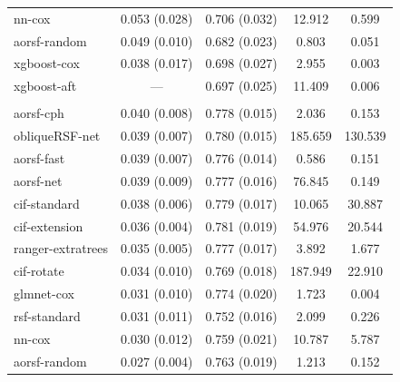 \documentclass[twoside,11pt]{article}\usepackage[]{graphicx}\usepackage[]{xcolor}
\newenvironment{knitrout}{}{} %
\begin{document}
\begin{knitrout}
\begin{longtable}[t]{lcccc}
\hspace{1em}nn-cox & 0.053 (0.028) & 0.706 (0.032) & 12.912 & 0.599\\
\hspace{1em}aorsf-random & 0.049 (0.010) & 0.682 (0.023) & 0.803 & 0.051\\
\hspace{1em}xgboost-cox & 0.038 (0.017) & 0.698 (0.027) & 2.955 & 0.003\\
\hspace{1em}xgboost-aft & --- & 0.697 (0.025) & 11.409 & 0.006\\
\addlinespace[0.3em]
\multicolumn{5}{l}{\textit{\textbf{JHS; coronary heart disease, n = 3501, p = 80}}}\\
\hline
\hspace{1em}aorsf-cph & 0.040 (0.008) & 0.778 (0.015) & 2.036 & 0.153\\
\hspace{1em}obliqueRSF-net & 0.039 (0.007) & 0.780 (0.015) & 185.659 & 130.539\\
\hspace{1em}aorsf-fast & 0.039 (0.007) & 0.776 (0.014) & 0.586 & 0.151\\
\hspace{1em}aorsf-net & 0.039 (0.009) & 0.777 (0.016) & 76.845 & 0.149\\
\hspace{1em}cif-standard & 0.038 (0.006) & 0.779 (0.017) & 10.065 & 30.887\\
\hspace{1em}cif-extension & 0.036 (0.004) & 0.781 (0.019) & 54.976 & 20.544\\
\hspace{1em}ranger-extratrees & 0.035 (0.005) & 0.777 (0.017) & 3.892 & 1.677\\
\hspace{1em}cif-rotate & 0.034 (0.010) & 0.769 (0.018) & 187.949 & 22.910\\
\hspace{1em}glmnet-cox & 0.031 (0.010) & 0.774 (0.020) & 1.723 & 0.004\\
\hspace{1em}rsf-standard & 0.031 (0.011) & 0.752 (0.016) & 2.099 & 0.226\\
\hspace{1em}nn-cox & 0.030 (0.012) & 0.759 (0.021) & 10.787 & 5.787\\
\hspace{1em}aorsf-random & 0.027 (0.004) & 0.763 (0.019) & 1.213 & 0.152\\

\end{longtable}
\end{knitrout}
\end{document}
